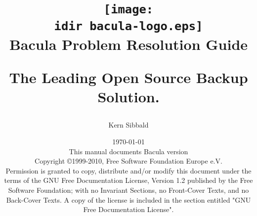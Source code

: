 \documentclass[10pt,a4paper]{book}
\begin{document}
\sloppy

\parskip 10pt
\parindent 0pt

\title{\texttt{[image: \\idir bacula-logo.eps]} \\ \bigskip
  \Huge{Bacula Problem Resolution Guide}
  \begin{center}
   \large{The Leading Open Source Backup Solution. }
  \end{center}
}


\author{Kern Sibbald}
\date{\vspace{1.0in}\today \\
      This manual documents Bacula version  \\
      \vspace{0.2in}
      Copyright \copyright 1999-2010, Free Software Foundation Europe
      e.V. \\
      \vspace{0.2in}
  Permission is granted to copy, distribute and/or modify this document under the terms of the
  GNU Free Documentation License, Version 1.2 published by the Free Software Foundation;
  with no Invariant Sections, no Front-Cover Texts, and no Back-Cover Texts.
  A copy of the license is included in the section entitled "GNU Free Documentation License".
}

\maketitle

\clearpage
\tableofcontents
\clearpage










\clearpage
\printindex[general]
\end{document}
